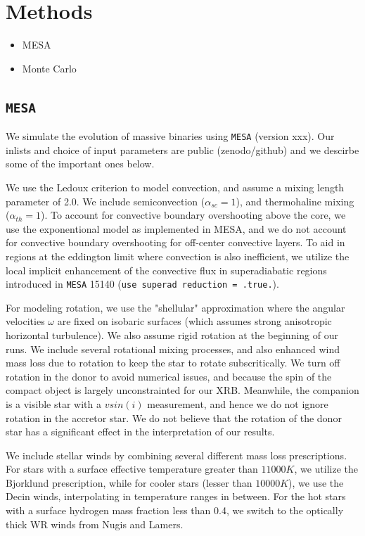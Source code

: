 \documentclass[linenumbers,trackchanges,twocolumn]{aastex701}
\begin{document}
\section{Methods} \label{sec:methods}

\begin{itemize}
    \item MESA
    \item Monte Carlo
\end{itemize}

\subsection{\texttt{MESA}}

We simulate the evolution of massive binaries using \texttt{MESA} (version xxx). Our inlists and choice of input parameters are public (zenodo/github) and we descirbe some of the important ones below.

We use the Ledoux criterion to model convection, and assume a mixing length parameter of 2.0. We include semiconvection ($\alpha_{sc}=1$), and thermohaline mixing ($\alpha_{th}=1$). To account for convective boundary overshooting above the core, we use the exponentional model as implemented in MESA, and we do not account for convective boundary overshooting for off-center convective layers. To aid in regions at the eddington limit where convection is also inefficient, we utilize the local implicit enhancement of the convective flux in superadiabatic regions introduced in \texttt{MESA} 15140 (\texttt{use superad reduction = .true.}).

For modeling rotation, we use the "shellular" approximation where the angular velocities $\omega$ are fixed on isobaric surfaces (which assumes strong anisotropic horizontal turbulence). We also assume rigid rotation at the beginning of our runs. We include several rotational mixing processes, and also enhanced wind mass loss due to rotation to keep the star to rotate subscritically. We turn off rotation in the donor to avoid numerical issues, and because the spin of the compact object is largely unconstrainted for our XRB. Meanwhile, the companion is a visible star with a $vsin(i)$ measurement, and hence we do not ignore rotation in the accretor star. We do not believe that the rotation of the donor star has a significant effect in the interpretation of our results. 

We include stellar winds by combining several different mass loss prescriptions. For stars with a surface effective temperature greater than $11000K$, we utilize the Bjorklund prescription, while for cooler stars (lesser than $10000K$), we use the Decin winds, interpolating in temperature ranges in between. For the hot stars with a surface hydrogen mass fraction less than 0.4, we switch to the optically thick WR winds from Nugis and Lamers.
\end{document}
